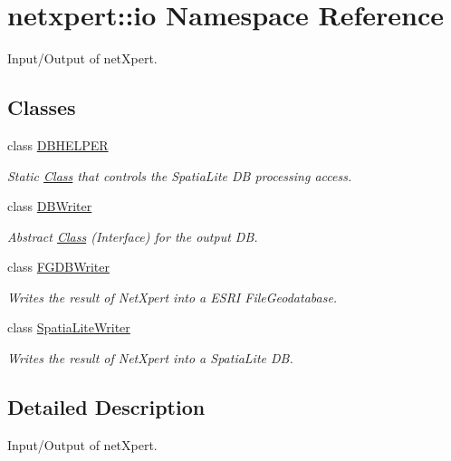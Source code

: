 \hypertarget{namespacenetxpert_1_1io}{}\section{netxpert\+:\+:io Namespace Reference}
\label{namespacenetxpert_1_1io}


Input/\+Output of net\+Xpert.  


\subsection*{Classes}
\begin{DoxyCompactItemize}
\item 
class \hyperlink{classnetxpert_1_1io_1_1DBHELPER}{D\+B\+H\+E\+L\+P\+ER}
\begin{DoxyCompactList}\small\item\em Static \hyperlink{classClass}{Class} that controls the Spatia\+Lite DB processing access. \end{DoxyCompactList}\item 
class \hyperlink{classnetxpert_1_1io_1_1DBWriter}{D\+B\+Writer}
\begin{DoxyCompactList}\small\item\em Abstract \hyperlink{classClass}{Class} (Interface) for the output DB. \end{DoxyCompactList}\item 
class \hyperlink{classnetxpert_1_1io_1_1FGDBWriter}{F\+G\+D\+B\+Writer}
\begin{DoxyCompactList}\small\item\em Writes the result of Net\+Xpert into a E\+S\+RI File\+Geodatabase. \end{DoxyCompactList}\item 
class \hyperlink{classnetxpert_1_1io_1_1SpatiaLiteWriter}{Spatia\+Lite\+Writer}
\begin{DoxyCompactList}\small\item\em Writes the result of Net\+Xpert into a Spatia\+Lite DB. \end{DoxyCompactList}\end{DoxyCompactItemize}


\subsection{Detailed Description}
Input/\+Output of net\+Xpert. 